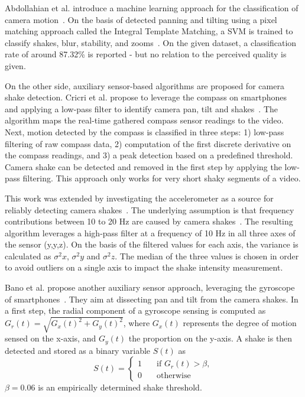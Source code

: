 Abdollahian et al. introduce a  machine learning approach for the classification of camera motion~\cite{Abdollahian2010}.
On the basis of detected panning and tilting using a pixel matching approach called the Integral Template Matching, a \ac{SVM} is trained to classify shakes, blur, stability, and zooms~\cite{Dong-JunLan2003}.
On the given dataset, a classification rate of around 87.32\% is reported - but no relation to the perceived quality is given.

On the other side, auxiliary sensor-based algorithms are proposed for camera shake detection.
Cricri et al. propose to leverage the compass on smartphones and applying a low-pass filter to identify camera pan, tilt and shakes~\cite{Cricri2012}. 
The algorithm maps the real-time gathered compass sensor readings to the video. 
Next, motion detected by the compass is classified in three steps: 1) low-pass filtering of raw compass data, 2) computation of the first discrete derivative on the compass readings, and 3) a peak detection based on a predefined threshold.
Camera shake can be detected and removed in the first step by applying the low-pass filtering.
This approach only works for very short shaky segments of a video.

This work was extended by investigating the accelerometer as a source for reliably detecting camera shakes~\cite{Cricri2012}.
The underlying assumption is that frequency contributions between 10 to 20 \unit{Hz} are caused by camera shakes~\cite{Yu2007}.
The resulting algorithm leverages a high-pass filter at a frequency of 10 \unit{Hz} in all three axes of the sensor (y,y,z).
On the basis of the filtered values for each axis, the variance is calculated as $\sigma^2 x$, $\sigma^2 y$ and $\sigma^2  z$.
The median of the three values is chosen in order to avoid outliers on a single axis to impact the shake intensity measurement.

Bano et al. propose another auxiliary sensor approach, leveraging the gyroscope of smartphones~\cite{Bano2015}.
They aim at dissecting pan and tilt from the camera shakes.
In a first step, the radial component of a gyroscope sensing is computed as $G_r(t) = \sqrt{G_x(t)^2 + G_y(t)^2}$, where $G_x(t)$ represents the degree of motion sensed on the x-axis, and $G_y(t)$ the proportion on the y-axis.
A shake is then detected and stored as a binary variable $S(t)$ as
\begin{equation}
S(t) =
 \begin{cases}
 1       & \quad \text{if } G_r(t) > \beta,\\
 0       & \quad \text{otherwise}
  \end{cases}
\end{equation}
$\beta = 0.06$ is an empirically determined shake threshold. 

